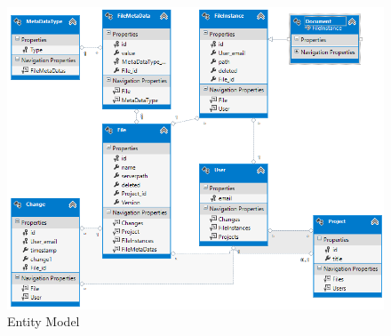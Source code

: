 \begin{figure}[H]
  \includegraphics[width=\textwidth,natwidth=793,natheight=635]{illustrations/entitymodel.png}
  \caption{Entity Model}
  \label{entitymodel}
\end{figure}